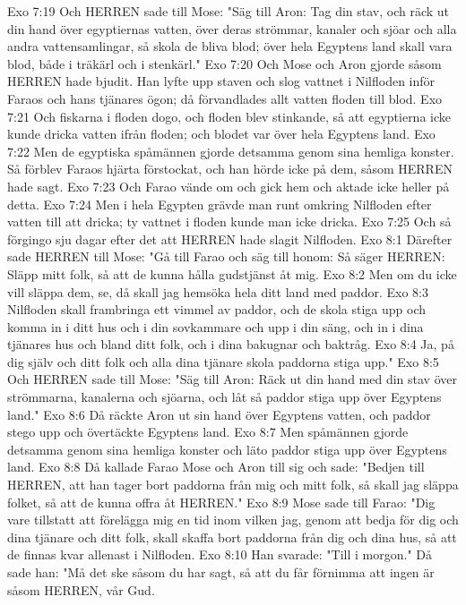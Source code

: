 Exo 7:19  Och HERREN sade till Mose: "Säg till Aron: Tag din stav, och räck ut din hand över egyptiernas vatten, över deras strömmar, kanaler och sjöar och alla andra vattensamlingar, så skola de bliva blod; över hela Egyptens land skall vara blod, både i träkärl och i stenkärl."
Exo 7:20  Och Mose och Aron gjorde såsom HERREN hade bjudit. Han lyfte upp staven och slog vattnet i Nilfloden inför Faraos och hans tjänares ögon; då förvandlades allt vatten floden till blod.
Exo 7:21  Och fiskarna i floden dogo, och floden blev stinkande, så att egyptierna icke kunde dricka vatten ifrån floden; och blodet var över hela Egyptens land.
Exo 7:22  Men de egyptiska spåmännen gjorde detsamma genom sina hemliga konster. Så förblev Faraos hjärta förstockat, och han hörde icke på dem, såsom HERREN hade sagt.
Exo 7:23  Och Farao vände om och gick hem och aktade icke heller på detta.
Exo 7:24  Men i hela Egypten grävde man runt omkring Nilfloden efter vatten till att dricka; ty vattnet i floden kunde man icke dricka.
Exo 7:25  Och så förgingo sju dagar efter det att HERREN hade slagit Nilfloden.
Exo 8:1  Därefter sade HERREN till Mose: "Gå till Farao och säg till honom: Så säger HERREN: Släpp mitt folk, så att de kunna hålla gudstjänst åt mig.
Exo 8:2  Men om du icke vill släppa dem, se, då skall jag hemsöka hela ditt land med paddor.
Exo 8:3  Nilfloden skall frambringa ett vimmel av paddor, och de skola stiga upp och komma in i ditt hus och i din sovkammare och upp i din säng, och in i dina tjänares hus och bland ditt folk, och i dina bakugnar och baktråg.
Exo 8:4  Ja, på dig själv och ditt folk och alla dina tjänare skola paddorna stiga upp."
Exo 8:5  Och HERREN sade till Mose: "Säg till Aron: Räck ut din hand med din stav över strömmarna, kanalerna och sjöarna, och låt så paddor stiga upp över Egyptens land."
Exo 8:6  Då räckte Aron ut sin hand över Egyptens vatten, och paddor stego upp och övertäckte Egyptens land.
Exo 8:7  Men spåmännen gjorde detsamma genom sina hemliga konster och läto paddor stiga upp över Egyptens land.
Exo 8:8  Då kallade Farao Mose och Aron till sig och sade: "Bedjen till HERREN, att han tager bort paddorna från mig och mitt folk, så skall jag släppa folket, så att de kunna offra åt HERREN."
Exo 8:9  Mose sade till Farao: "Dig vare tillstatt att förelägga mig en tid inom vilken jag, genom att bedja för dig och dina tjänare och ditt folk, skall skaffa bort paddorna från dig och dina hus, så att de finnas kvar allenast i Nilfloden.
Exo 8:10  Han svarade: "Till i morgon." Då sade han: "Må det ske såsom du har sagt, så att du får förnimma att ingen är såsom HERREN, vår Gud.
